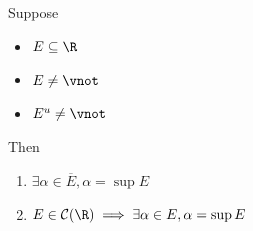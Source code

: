 \begin{theorem} \label{an1:thm:supremum-in-closure}
  Suppose
  \begin{itemize}
    \item $E \subseteq \R$
    \item $E \neq \vnot$
    \item $E^{u} \neq \vnot$
  \end{itemize}
  Then
  \begin{enumerate}[label=\textbf{(\Alph*)}]
    \item $\exists \alpha \in \overline{E}, \alpha = \sup E$
    \item $E \in \mathcal{C}(\R) \implies \exists \alpha \in E, \alpha = \sup E$
  \end{enumerate}
\end{theorem}
